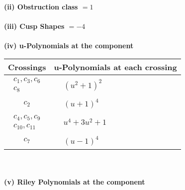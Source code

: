 \documentclass[1p]{elsarticle_modified}
\theoremstyle{definition}
\begin{document}
\flushleft \textbf{(ii) Obstruction class $= 1$}\\~\\
\flushleft \textbf{(iii) Cusp Shapes $= -4$}\\~\\
\newpage\renewcommand{\arraystretch}{1}
\flushleft \textbf{(iv) u-Polynomials at the component}\newline \\
\begin{tabular}{m{50pt}|m{274pt}}
Crossings & \hspace{64pt}u-Polynomials at each crossing \\
\hline $$\begin{aligned}c_{1},c_{3},c_{6}\\c_{8}\end{aligned}$$&$\begin{aligned}
&(u^2+1)^2
\end{aligned}$\\
\hline $$\begin{aligned}c_{2}\end{aligned}$$&$\begin{aligned}
&(u+1)^4
\end{aligned}$\\
\hline $$\begin{aligned}c_{4},c_{5},c_{9}\\c_{10},c_{11}\end{aligned}$$&$\begin{aligned}
&u^4+3 u^2+1
\end{aligned}$\\
\hline $$\begin{aligned}c_{7}\end{aligned}$$&$\begin{aligned}
&(u-1)^4
\end{aligned}$\\
\hline
\end{tabular}\\~\\
\newpage\renewcommand{\arraystretch}{1}
\flushleft \textbf{(v) Riley Polynomials at the component}\newline \\
\end{document}
